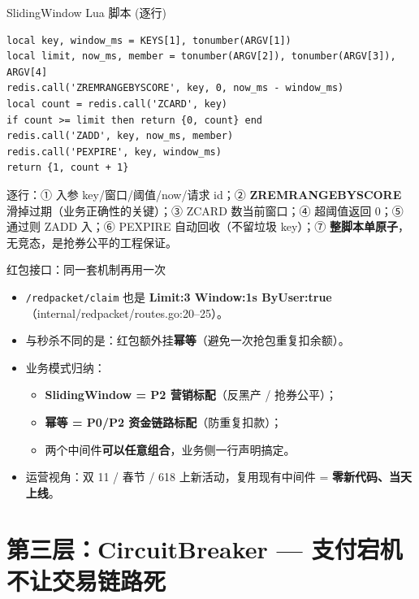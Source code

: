 \documentclass[aspectratio=169,11pt]{beamer}
\begin{document}
\begin{frame}{SlidingWindow Lua 脚本 (逐行)}
\begin{lstlisting}[language=LuaRedis,firstnumber=18,basicstyle=\ttfamily\tiny,
  caption={}]
local key, window_ms = KEYS[1], tonumber(ARGV[1])
local limit, now_ms, member = tonumber(ARGV[2]), tonumber(ARGV[3]), ARGV[4]
redis.call('ZREMRANGEBYSCORE', key, 0, now_ms - window_ms)
local count = redis.call('ZCARD', key)
if count >= limit then return {0, count} end
redis.call('ZADD', key, now_ms, member)
redis.call('PEXPIRE', key, window_ms)
return {1, count + 1}
\end{lstlisting}
\small 逐行：① 入参 key/窗口/阈值/now/请求 id；② \textbf{ZREMRANGEBYSCORE} 滑掉过期（业务正确性的关键）；③ ZCARD 数当前窗口；④ 超阈值返回 0；⑤ 通过则 ZADD 入；⑥ PEXPIRE 自动回收（不留垃圾 key）；⑦ \textbf{整脚本单原子}，无竞态，是抢券公平的工程保证。
\end{frame}

\begin{frame}[shrink]{红包接口：同一套机制再用一次}
\begin{itemize}
  \item \texttt{/redpacket/claim} 也是 \textbf{Limit:3 Window:1s ByUser:true}（internal/redpacket/routes.go:20--25）。
  \item 与秒杀不同的是：红包额外挂\textbf{幂等}（避免一次抢包重复扣余额）。
  \item 业务模式归纳：
  \begin{itemize}
    \item \textbf{SlidingWindow = P2 营销标配}（反黑产 / 抢券公平）；
    \item \textbf{幂等 = P0/P2 资金链路标配}（防重复扣款）；
    \item 两个中间件\textbf{可以任意组合}，业务侧一行声明搞定。
  \end{itemize}
  \item 运营视角：双 11 / 春节 / 618 上新活动，复用现有中间件 = \textbf{零新代码、当天上线}。
\end{itemize}
\end{frame}

\section{第三层：CircuitBreaker — 支付宕机不让交易链路死}
\end{document}
